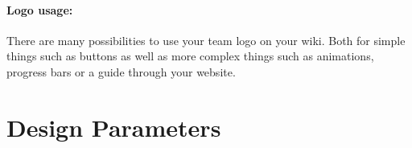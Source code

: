 \paragraph{Logo usage:} There are many possibilities to use your team logo on your wiki.
Both for simple things such as buttons as well as more complex things such as animations, progress bars or a guide through your website.

\section{Design Parameters} \label{sec:design-paramaters} 
